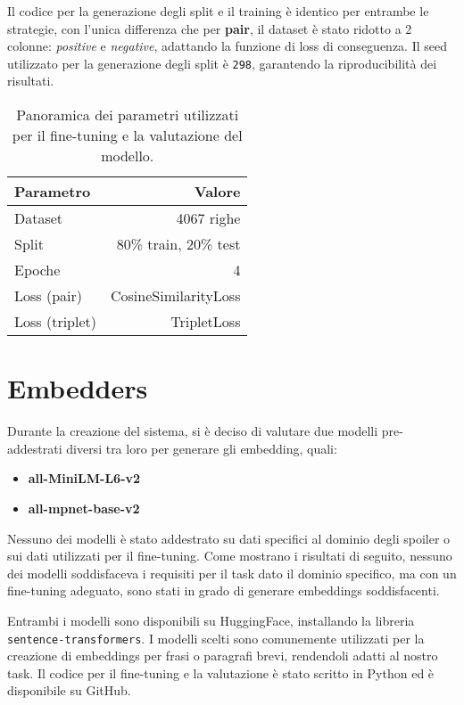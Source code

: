 Il codice per la generazione degli split e il training è
identico per entrambe le strategie, con l'unica differenza
che per \textbf{pair}, il dataset è stato ridotto a 2
colonne: \textit{positive} e \textit{negative}, adattando
la funzione di loss di conseguenza.
Il seed utilizzato per la generazione degli split è
\texttt{298}\cite{nisemonogatari_ep1}, garantendo la
riproducibilità dei risultati.

\begin{table}[H]
  \centering
  \begin{tabularx}{\textwidth}{l @{\extracolsep{\fill}} r}
    \toprule
    \textbf{Parametro} & \textbf{Valore}       \\
    \midrule
    Dataset            & 4067 righe            \\
    Split              & 80\% train, 20\% test \\
    Epoche             & 4                     \\
    Loss (pair)        & CosineSimilarityLoss  \\
    Loss (triplet)     & TripletLoss           \\
    \bottomrule
  \end{tabularx}
  \caption{Panoramica dei parametri utilizzati per il fine-tuning e la valutazione del modello.}
  \label{tab:dataset_eval}
\end{table}

\section{Embedders}
\label{sec:embedders_eval}
Durante la creazione del sistema, si è deciso di
valutare due modelli pre-addestrati diversi tra loro per generare gli embedding, quali:

\begin{itemize}
  \item \textbf{all-MiniLM-L6-v2}
  \item \textbf{all-mpnet-base-v2}
\end{itemize}

Nessuno dei modelli è stato addestrato su dati specifici al
dominio degli spoiler o sui dati utilizzati per il
fine-tuning.
Come mostrano i risultati di seguito, nessuno dei modelli
soddisfaceva i requisiti per il task dato il dominio
specifico, ma con un fine-tuning adeguato, sono stati in
grado di generare embeddings soddisfacenti.

Entrambi i modelli sono disponibili su HuggingFace,
installando la libreria \texttt{sentence-transformers}.
I modelli scelti sono comunemente utilizzati per la
creazione di embeddings per frasi o paragrafi brevi,
rendendoli adatti al nostro task.
Il codice per il fine-tuning e la valutazione è stato
scritto in Python ed è disponibile su
GitHub\cite{af64_spoiler_filter}.

